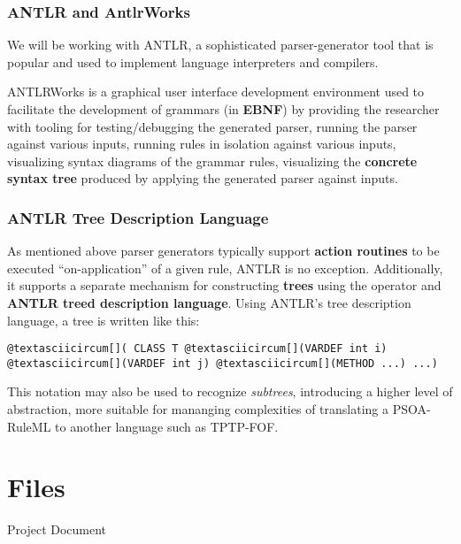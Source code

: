 \documentclass[letterpaper,10pt,english]{sphinxmanual}
\begin{document}
\subsection{ANTLR and AntlrWorks}
\label{project-proposal/index:antlr-and-antlrworks}
We will be working with ANTLR, a sophisticated parser-generator tool that is
popular and used to implement language interpreters and compilers.

ANTLRWorks is a graphical user interface development environment used to
facilitate the development of grammars (in \textbf{EBNF}) by providing the researcher
with tooling for testing/debugging the generated parser, running the parser
against various inputs, running rules in isolation against various inputs,
visualizing syntax diagrams of the grammar rules, visualizing the \textbf{concrete
syntax tree} produced by applying the generated parser against inputs.


\subsection{ANTLR Tree Description Language}
\label{project-proposal/index:antlr-tree-description-language}
As mentioned above parser generators typically support \textbf{action routines} to be
executed ``on-application'' of a given rule, ANTLR is no exception.  Additionally,
it supports a separate mechanism for constructing \textbf{trees} using the \code{-\textgreater{}}
operator and \textbf{ANTLR treed description language}.  Using ANTLR’s tree
description language, a tree is written like this:

\begin{Verbatim}[commandchars=@\[\]]
@textasciicircum[]( CLASS T @textasciicircum[](VARDEF int i) @textasciicircum[](VARDEF int j) @textasciicircum[](METHOD ...) ...)
\end{Verbatim}

This notation may also be used to recognize \emph{subtrees}, introducing a higher
level of abstraction, more suitable for mananging complexities of translating a
PSOA-RuleML to another language such as TPTP-FOF.


\chapter{Files}
\label{main:files}
Project Document
\end{document}
